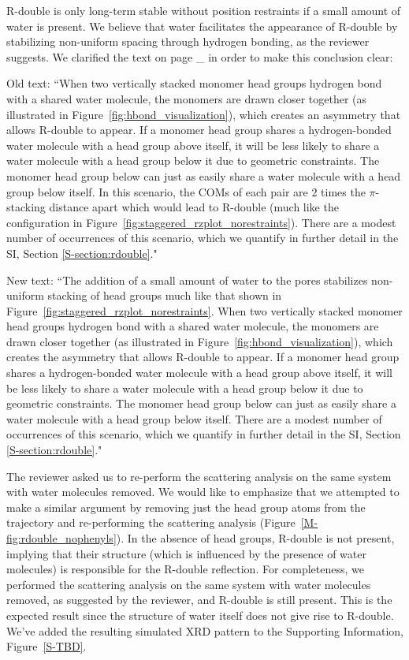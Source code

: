 \documentclass{article}
\begin{document}
\begin{enumerate}
    R-double is only long-term stable without position restraints if a small
    amount of water is present. We believe that water facilitates the appearance
    of R-double by stabilizing non-uniform spacing through hydrogen bonding, as the
    reviewer suggests. We clarified the text on page \_ in order to make this 
    conclusion clear:

    Old text: ``When two vertically stacked monomer head groups hydrogen bond
    with a shared water molecule, the monomers are drawn closer together (as
    illustrated in Figure~\ref{fig:hbond_visualization}), which creates an
    asymmetry that allows R-double to appear. If a monomer head group shares a
    hydrogen-bonded water molecule with a head group above itself, it will be less
    likely to share a water molecule with a head group below it due to geometric
    constraints. The monomer head group below can just as easily share a water
    molecule with a head group below itself. In this scenario, the COMs of each
    pair are 2 times the $\pi$-stacking distance apart which would lead to R-double
    (much like the configuration in
     Figure~\ref{fig:staggered_rzplot_norestraints}). There are a modest number of
    occurrences of this scenario, which we quantify in further detail in the SI,
    Section \ref{S-section:rdouble}."

    New text: ``The addition of a small amount of water to the pores stabilizes
    non-uniform stacking of head groups much like that shown in
    Figure~\ref{fig:staggered_rzplot_norestraints}. When two vertically stacked
    monomer head groups hydrogen bond with a shared water molecule, the monomers
    are drawn closer together (as illustrated in
    Figure~\ref{fig:hbond_visualization}), which creates the asymmetry that allows
    R-double to appear. If a monomer head group shares a hydrogen-bonded water
    molecule with a head group above itself, it will be less likely to share a
    water molecule with a head group below it due to geometric constraints. The
    monomer head group below can just as easily share a water molecule with a head
    group below itself. There are a modest number of occurrences of this scenario,
    which we quantify in further detail in the SI, Section
    \ref{S-section:rdouble}."

    The reviewer asked us to re-perform the scattering analysis on the same
    system with water molecules removed. We would like to emphasize that we
    attempted to make a similar argument by removing just the head group atoms from
    the trajectory and re-performing the scattering analysis
    (Figure~\ref{M-fig:rdouble_nophenyls}). In the absence of head groups, R-double
    is not present, implying that their structure (which is influenced by the
    presence of water molecules) is responsible for the R-double reflection. For
    completeness, we performed the scattering analysis on the same system with
    water molecules removed, as suggested by the reviewer, and R-double is still
    present. This is the expected result since the structure of water itself does
    not give rise to R-double. We've added the resulting simulated XRD pattern to
    the Supporting Information, Figure~\ref{S-TBD}. 
   

\end{enumerate}
\end{document}
